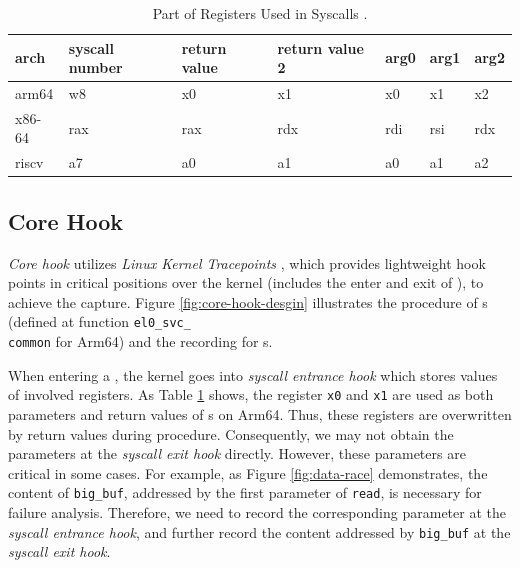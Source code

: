 \begin{table}
    \caption{
        Part of Registers Used in Syscalls \cite{syscall}.}
    \centering
    \begin{tabular}{lllllll}
        \toprule
        arch                      &  syscall number &
        return value &
        return value 2 & arg0                      & arg1 &
        arg2                                                               \\
        \midrule
        arm64                     & w8                        & x0   & x1
                                  & x0                        & x1   & x2  \\
        x86-64                    & rax                       & rax  &
        rdx                       & rdi                       & rsi  & rdx
        \\
        riscv                     & a7                        & a0   & a1
                                  & a0                        & a1   & a2  \\
        \bottomrule
    \end{tabular}
    \label{table:arch_registers}
\end{table}


\subsection{Core Hook}

\textit{Core hook} utilizes \textit{Linux Kernel Tracepoints} \cite{mathieu2021using}, which
provides lightweight hook points in critical positions over the kernel
(includes the enter and exit of \syscall{}), to achieve the capture.  Figure \ref{fig:core-hook-desgin} illustrates the procedure of \syscall{}s
(defined at function \texttt{el0\_svc\_\\common} for Arm64) and the recording for \syscall{}s. 


When entering a \syscall{}, the kernel goes into \textit{syscall entrance
hook} which stores values of involved registers. As Table
\ref{table:arch_registers} shows, the register \texttt{x0} and \texttt{x1} are used as both
parameters and return values of \syscall{}s on Arm64. Thus, these registers are
overwritten by return values during \syscall{} procedure. Consequently, we may not
obtain the \syscall{} parameters at the \textit{syscall exit hook} directly.
However, these parameters are critical in some cases. For example, as Figure
\ref{fig:data-race} demonstrates, the content of \texttt{big\_buf}, addressed by
the first parameter of \texttt{read}, is necessary for failure analysis.
Therefore, we need to record the corresponding parameter at the \textit{syscall
entrance hook}, and further record the content addressed by \texttt{big\_buf} at 
the \textit{syscall exit hook}.

